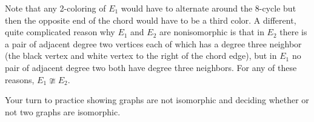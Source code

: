 \begin{exam}
\begin{apart}
\begin{soln}
\begin{figure}[hbtp]
                            \label{fig_notism_Ham8_bipartite}
                        \end{figure}                     
                    Note that any 2-coloring of $E_1$ would have to alternate around the 8-cycle but then the opposite end of the chord would have to be a third color. A different, quite complicated reason why $E_1$ and $E_2$ are nonisomorphic is that in $E_2$ there is a pair of adjacent degree two vertices each of which has a degree three neighbor (the black vertex and white vertex to the right of the chord edge), but in $E_1$ no pair of adjacent degree two both have degree three neighbors. For any of these reasons, $E_1 \ncong E_2$.
                \end{soln}
        \end{apart}
\end{exam}

Your turn to practice showing graphs are not isomorphic and deciding whether or not two graphs are isomorphic.

